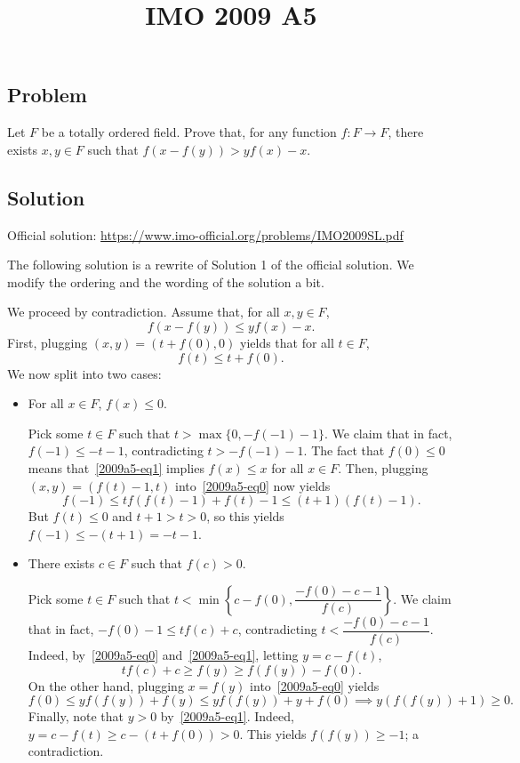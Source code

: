 \documentclass{article}
\title{IMO 2009 A5}
\author{}
\date{}
\begin{document}
\maketitle



\subsection*{Problem}

Let $F$ be a totally ordered field.
Prove that, for any function $f : F \to F$, there exists $x, y \in F$ such that $f(x - f(y)) > y f(x) - x$.



\subsection*{Solution}

Official solution: \url{https://www.imo-official.org/problems/IMO2009SL.pdf}

The following solution is a rewrite of Solution 1 of the official solution.
We modify the ordering and the wording of the solution a bit.

We proceed by contradiction.
Assume that, for all $x, y \in F$,
\[ f(x - f(y)) \leq y f(x) - x. \tag{*}\label{2009a5-eq0} \]
First, plugging $(x, y) = (t + f(0), 0)$ yields that for all $t \in F$,
\[ f(t) \leq t + f(0). \tag{1}\label{2009a5-eq1} \]
We now split into two cases:

\begin{itemize}

    \item 
    For all $x \in F$, $f(x) \leq 0$.

    Pick some $t \in F$ such that $t > \max\{0, -f(-1) - 1\}$.
    We claim that in fact, $f(-1) \leq -t - 1$, contradicting $t > -f(-1) - 1$.
    The fact that $f(0) \leq 0$ means that~\eqref{2009a5-eq1} implies $f(x) \leq x$ for all $x \in F$.
    Then, plugging $(x, y) = (f(t) - 1, t)$ into~\eqref{2009a5-eq0} now yields
    \[ f(-1) \leq tf(f(t) - 1) + f(t) - 1 \leq (t + 1)(f(t) - 1). \]
    But $f(t) \leq 0$ and $t + 1 > t > 0$, so this yields $f(-1) \leq -(t + 1) = -t - 1$.

    \item
    There exists $c \in F$ such that $f(c) > 0$.

    Pick some $t \in F$ such that $t < \min\left\{c - f(0), \dfrac{-f(0) - c - 1}{f(c)}\right\}$.
    We claim that in fact, $-f(0) - 1 \leq tf(c) + c$, contradicting $t < \dfrac{-f(0) - c - 1}{f(c)}$.
    Indeed, by~\eqref{2009a5-eq0} and~\eqref{2009a5-eq1}, letting $y = c - f(t)$,
    \[ tf(c) + c \geq f(y) \geq f(f(y)) - f(0). \]
    On the other hand, plugging $x = f(y)$ into~\eqref{2009a5-eq0} yields
    \[ f(0) \leq y f(f(y)) + f(y) \leq y f(f(y)) + y + f(0) \implies y (f(f(y)) + 1) \geq 0. \]
    Finally, note that $y > 0$ by~\eqref{2009a5-eq1}.
    Indeed, $y = c - f(t) \geq c - (t + f(0)) > 0$.
    This yields $f(f(y)) \geq -1$; a contradiction.

\end{itemize}
\end{document}
